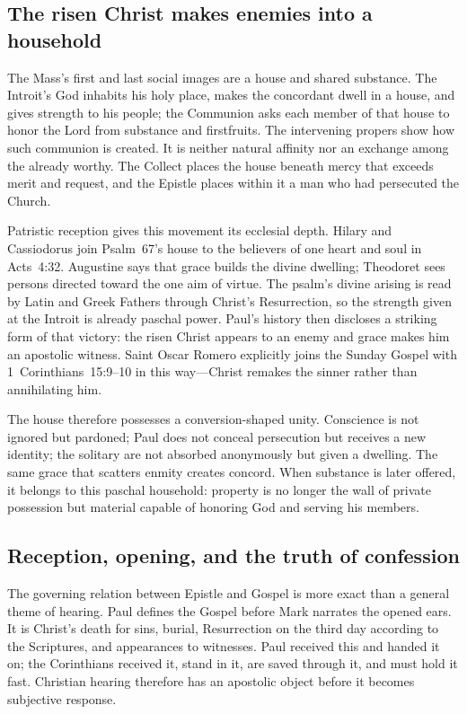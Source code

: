 \subsection*{The risen Christ makes enemies into a household}

The Mass's first and last social images are a house and shared substance. The
Introit's God inhabits his holy place, makes the concordant dwell in a house,
and gives strength to his people; the Communion asks each member of that house
to honor the Lord from substance and firstfruits. The intervening propers show
how such communion is created. It is neither natural affinity nor an exchange
among the already worthy. The Collect places the house beneath mercy that
exceeds merit and request, and the Epistle places within it a man who had
persecuted the Church.

Patristic reception gives this movement its ecclesial depth. Hilary and
Cassiodorus join Psalm~67's house to the believers of one heart and soul in
Acts~4:32. Augustine says that grace builds the divine dwelling; Theodoret
sees persons directed toward the one aim of virtue. The psalm's divine arising
is read by Latin and Greek Fathers through Christ's Resurrection, so the
strength given at the Introit is already paschal power. Paul's history then
discloses a striking form of that victory: the risen Christ appears to an enemy
and grace makes him an apostolic witness. Saint Oscar Romero explicitly joins
the Sunday Gospel with 1~Corinthians~15:9--10 in this way---Christ remakes the
sinner rather than annihilating him.

The house therefore possesses a conversion-shaped unity. Conscience is not
ignored but pardoned; Paul does not conceal persecution but receives a new
identity; the solitary are not absorbed anonymously but given a dwelling. The
same grace that scatters enmity creates concord. When substance is later
offered, it belongs to this paschal household: property is no longer the wall
of private possession but material capable of honoring God and serving his
members.

\subsection*{Reception, opening, and the truth of confession}

The governing relation between Epistle and Gospel is more exact than a general
theme of hearing. Paul defines the Gospel before Mark narrates the opened ears.
It is Christ's death for sins, burial, Resurrection on the third day according
to the Scriptures, and appearances to witnesses. Paul received this and handed
it on; the Corinthians received it, stand in it, are saved through it, and must
hold it fast. Christian hearing therefore has an apostolic object before it
becomes subjective response.

